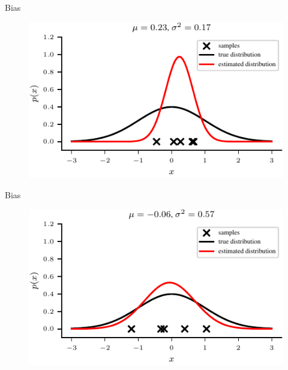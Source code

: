 \documentclass[handout]{beamer}
\begin{document}
             \begin{frame}{Bias }
            \begin{figure}
                \includegraphics{../figures/mle/biased-mle-normal-5-1.pdf}
            \end{figure}
            
        \end{frame}

             \begin{frame}{Bias }
            \begin{figure}
                \includegraphics{../figures/mle/biased-mle-normal-5-2.pdf}
            \end{figure}
            
        \end{frame}
\end{document}
